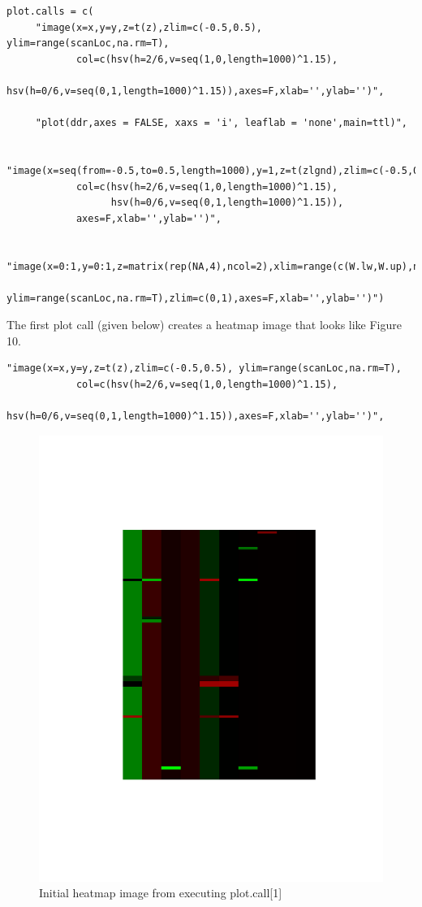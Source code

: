 \documentclass[]{article}
\begin{document}
\begin{verbatim}
plot.calls = c(
     "image(x=x,y=y,z=t(z),zlim=c(-0.5,0.5), ylim=range(scanLoc,na.rm=T),
            col=c(hsv(h=2/6,v=seq(1,0,length=1000)^1.15),
            hsv(h=0/6,v=seq(0,1,length=1000)^1.15)),axes=F,xlab='',ylab='')",

     "plot(ddr,axes = FALSE, xaxs = 'i', leaflab = 'none',main=ttl)",

     "image(x=seq(from=-0.5,to=0.5,length=1000),y=1,z=t(zlgnd),zlim=c(-0.5,0.5),
            col=c(hsv(h=2/6,v=seq(1,0,length=1000)^1.15),
                  hsv(h=0/6,v=seq(0,1,length=1000)^1.15)),
            axes=F,xlab='',ylab='')",

     "image(x=0:1,y=0:1,z=matrix(rep(NA,4),ncol=2),xlim=range(c(W.lw,W.up),na.rm=T),
            ylim=range(scanLoc,na.rm=T),zlim=c(0,1),axes=F,xlab='',ylab='')")

\end{verbatim}


\indent The first plot call (given below) creates a heatmap image that looks like Figure 10. 
\begin{verbatim}
"image(x=x,y=y,z=t(z),zlim=c(-0.5,0.5), ylim=range(scanLoc,na.rm=T),
            col=c(hsv(h=2/6,v=seq(1,0,length=1000)^1.15),
            hsv(h=0/6,v=seq(0,1,length=1000)^1.15)),axes=F,xlab='',ylab='')",
\end{verbatim}
 
\begin{center}
\begin{figure}
\includegraphics[scale=.5]{heatmap}
\caption{Initial heatmap image from executing plot.call[1]}
\end{figure}
\end{center}
\end{document}
